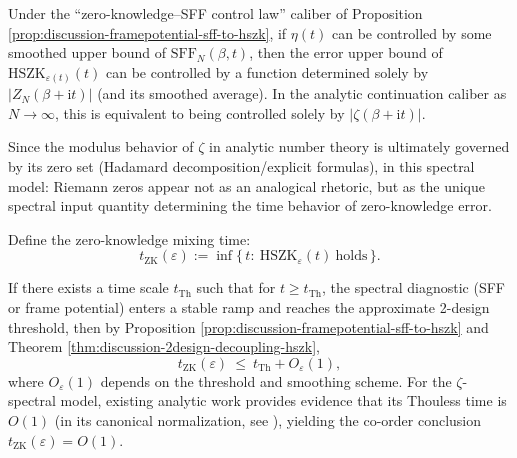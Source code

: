 \begin{proposition}\label{prop:discussion-zeta-spectral-hszk}
Under the ``zero-knowledge--SFF control law'' caliber of Proposition \ref{prop:discussion-framepotential-sff-to-hszk},
if \(\eta(t)\) can be controlled by some smoothed upper bound of \(\mathrm{SFF}_N(\beta,t)\), then the error upper bound of \(\mathrm{HSZK}_{\varepsilon(t)}(t)\) can be controlled by a function determined solely by \(|Z_N(\beta+\mathrm{i}t)|\) (and its smoothed average).
In the analytic continuation caliber as \(N\to\infty\), this is equivalent to being controlled solely by \(|\zeta(\beta+\mathrm{i}t)|\).
\par
Since the modulus behavior of \(\zeta\) in analytic number theory is ultimately governed by its zero set (Hadamard decomposition/explicit formulas), in this spectral model:
Riemann zeros appear not as an analogical rhetoric, but as the unique spectral input quantity determining the time behavior of zero-knowledge error.
\end{proposition}

\begin{definition}\label{def:discussion-zk-mixing-time}
Define the zero-knowledge mixing time:
\[
t_{\mathrm{ZK}}(\varepsilon):=\inf\{\,t:\ \mathrm{HSZK}_{\varepsilon}(t)\ \text{holds}\,\}.
\]
\end{definition}

\begin{corollary}\label{cor:discussion-zk-vs-thouless}
If there exists a time scale \(t_{\mathrm{Th}}\) such that for \(t\ge t_{\mathrm{Th}}\), the spectral diagnostic (SFF or frame potential) enters a stable ramp and reaches the approximate 2-design threshold, then by Proposition \ref{prop:discussion-framepotential-sff-to-hszk} and Theorem \ref{thm:discussion-2design-decoupling-hszk},
\[
t_{\mathrm{ZK}}(\varepsilon)\ \le\ t_{\mathrm{Th}}+O_\varepsilon(1),
\]
where \(O_\varepsilon(1)\) depends on the threshold and smoothing scheme.
For the \(\zeta\)-spectral model, existing analytic work provides evidence that its Thouless time is \(O(1)\) (in its canonical normalization, see \cite{BasuDasKrishnan2025AnalyticZetaRamp}), yielding the co-order conclusion \(t_{\mathrm{ZK}}(\varepsilon)=O(1)\).
\end{corollary}

